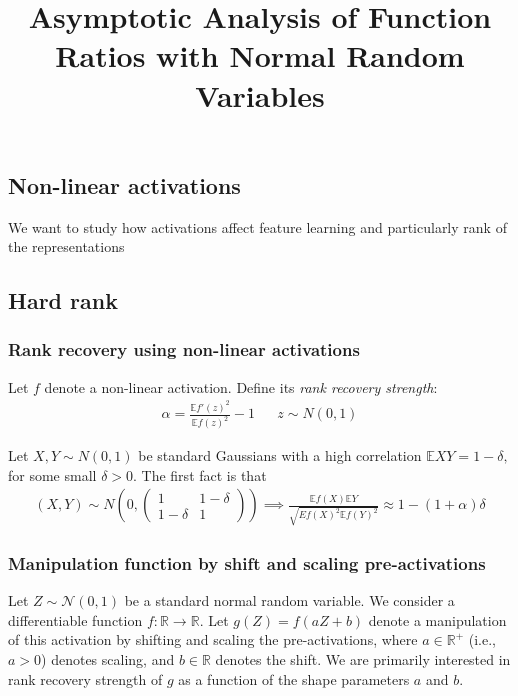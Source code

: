 \documentclass[11pt]{article}
\title{Asymptotic Analysis of Function Ratios with Normal Random Variables}
\author{}
\date{}
\newcommand{\E}{\mathbb{E}}
\begin{document}
\maketitle

\subsection{Non-linear activations}
We want to study how activations affect feature learning and particularly rank of the representations 

\subsection{Hard rank}

\subsubsection{Rank recovery using non-linear activations}
Let $f$ denote a non-linear activation. Define its \emph{rank recovery strength}:
\begin{align*}
    \alpha = \frac{\E f'(z)^2}{\E f(z)^2 } - 1 && z \sim N(0,1)
\end{align*}

Let $X,Y \sim N(0,1)$ be standard Gaussians with a high correlation  $\E X Y = 1-\delta, $ for some small $\delta > 0.$ The first fact is that 
\begin{align*}
   (X,Y)\sim N\left(0,\begin{pmatrix}
       1 & 1-\delta \\ 1-\delta & 1
   \end{pmatrix} \right) \implies  \frac{\E f(X) \E Y }{\sqrt{E f(X)^2 \E f(Y)^2 }}\approx 1 - (1+\alpha)\delta 
\end{align*}


\subsubsection{Manipulation function by shift and scaling pre-activations}

Let $Z \sim \mathcal{N}(0,1)$ be a standard normal random variable. We consider a differentiable function $f: \mathbb{R} \to \mathbb{R}$. Let $g(Z) = f(aZ+b)$ denote a manipulation of this activation by shifting and scaling the pre-activations,  where $a \in \mathbb{R}^+$ (i.e., $a>0$) denotes scaling, and $b \in \mathbb{R}$ denotes the shift. We are primarily interested in rank recovery strength of $g$ as a function of the shape parameters $a$ and $b.$ 
\end{document}
